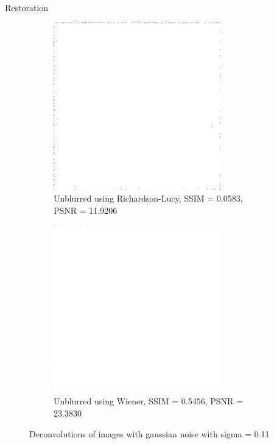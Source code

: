 \documentclass[aspectratio=1610]{beamer}
\begin{document}
\begin{frame}{Restoration}
  \begin{figure}
    \centering
    \begin{subfigure}[t]{0.4\textwidth}
        \includegraphics[width=0.8\textwidth]{images/unblurred_rl_mid_noise.png}
        \caption{Unblurred using Richardson-Lucy, \break SSIM = 0.0583, PSNR = 11.9206}
        \label{fig:restored5}
    \end{subfigure}
    \begin{subfigure}[t]{0.4\textwidth}
        \includegraphics[width=0.8\textwidth]{images/unblurred_w_mid_noise.png}
        \caption{Unblurred using Wiener, \break SSIM = 0.5456, PSNR = 23.3830}
        \label{fig:restored6}
    \end{subfigure}
    \caption{Deconvolutions of images with gaussian noise with sigma = 0.11}
  \end{figure}
\end{frame}
\end{document}
